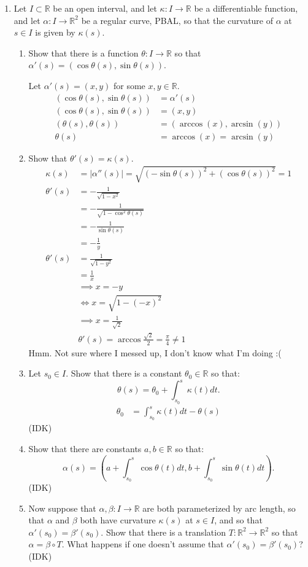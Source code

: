 \documentclass[a4paper,17pt]{extarticle}
\theoremstyle{definition}
\renewcommand{\skip}{\par\null\par}
\newcommand{\R}{\mathbb{R}}
\begin{document}
\begin{enumerate}
\begin{proof}
    \end{proof}
    \item Let $I\subset\R$ be an open interval, and let $\kappa:I\to\R$ be a differentiable function, and let $\alpha:I\to\R^2$ be a regular curve, PBAL, so that the curvature of $\alpha$ at $s\in I$ is given by $\kappa(s)$.\begin{enumerate}[label=\alph*.]
        \item Show that there is a function $\theta:I\to\R$ so that $\alpha'(s)=(\cos\theta(s),\sin\theta(s))$.\skip Let $\alpha'(s)=(x,y)$ for some $x,y\in\R$. \begin{align*}
        (\cos\theta(s),\sin\theta(s))&=\alpha'(s)\\
        (\cos\theta(s),\sin\theta(s))&=(x,y)\\
        (\theta(s),\theta(s))&=(\arccos(x),\arcsin(y))\\
        \theta(s)&=\arccos(x)=\arcsin(y)
        \end{align*}
        \item Show that $\theta'(s)=\kappa(s)$.\begin{align*}
            \kappa(s)&=|\alpha''(s)|=\sqrt{(-\sin\theta(s))^2+(\cos\theta(s))^2}=1\\
            \theta'(s)&=-\frac{1}{\sqrt{1-x^2}}\\
            &=-\frac{1}{\sqrt{1-\cos^2\theta(s)}}\\
            &=-\frac{1}{\sin\theta(s)}\\
            &=-\frac{1}{y}\\
            \theta'(s)&=\frac{1}{\sqrt{1-y^2}}\\
            &=\frac{1}{x}\\
            &\implies x=-y\\
            &\Longleftrightarrow x=\sqrt{1-(-x)^2}\\
            &\implies x=\frac{1}{\sqrt{2}}\\
            &\theta'(s)=\arccos\frac{\sqrt{2}}{2}=\frac{\pi}{4}\neq1
    \end{align*} Hmm. Not sure where I messed up, I don't know what I'm doing :(
        \item Let $s_0\in I$. Show that there is a constant $\theta_0\in\R$ so that: $$\theta(s)=\theta_0+\int_{s_0}^s\kappa(t)dt.$$\begin{align*}
            \theta_0&=\int_{s_0}^s\kappa(t)dt-\theta(s)
        \end{align*} (IDK)
        \item Show that there are constants $a,b\in\R$ so that: $$\alpha(s)=(a+\int_{s_0}^s\cos\theta(t)dt,b+\int_{s_0}^s\sin\theta(t)dt).$$ (IDK)
        \item Now suppose that $\alpha,\beta : I\to\R$ are both parameterized by arc length, so that $\alpha$ and $\beta$ both have curvature $\kappa(s)$ at $s\in I$, and so that $\alpha'(s_0) =\beta'(s_0)$. Show that there is a translation $T : \R^2\to\R^2$ so that $\alpha=\beta\circ T$. What happens if one doesn't assume that $\alpha'(s_0) =\beta'(s_0)$? (IDK)
    \end{enumerate}
\end{enumerate}
\end{document}
